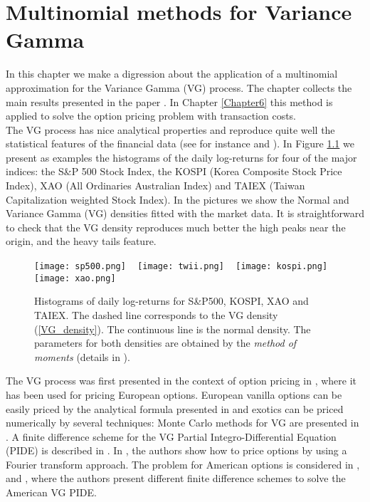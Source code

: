 

\chapter{Multinomial methods for Variance Gamma}\label{Chapter3}
\minitoc%

\vspace{5em}


 
In this chapter we make a digression about the application of a multinomial approximation for the Variance Gamma (VG) process.
The chapter collects the main results presented in the paper \cite{Canta2}. In Chapter \ref{Chapter6} this method is applied to solve the option pricing problem with 
transaction costs.\\
 
The VG process has nice analytical properties and 
reproduce quite well the statistical features of the financial data (see for instance \cite{Ait12} and \cite{Cont}).
In Figure \ref{FigPDF} we present as examples the histograms of the
daily log-returns for four of the major indices:  
the S\&P 500 Stock Index, 
the KOSPI (Korea Composite Stock Price Index), 
XAO (All Ordinaries Australian Index)  
and TAIEX (Taiwan Capitalization weighted Stock Index).
In the pictures we show the Normal and Variance Gamma (VG) densities fitted with the market data. 
It is straightforward to check that the 
VG density reproduces much better the high peaks near the origin, and the heavy tails feature.

\begin{figure}[t!]
 \centering
 \texttt{[image: sp500.png]}
 ~
 \texttt{[image: twii.png]}
 ~
 \texttt{[image: kospi.png]}
 ~
 \texttt{[image: xao.png]}
 \caption{Histograms of daily log-returns for S\&P500, KOSPI, XAO and TAIEX. The dashed line corresponds to the VG density (\ref{VG_density}). 
 The continuous line is the normal density. The parameters for both densities are obtained by the \emph{method of moments} (details in \cite{Se04}).}
 \label{FigPDF}
\end{figure} 

The VG process was first presented in the context of option pricing 
in \cite{MaMi91}, where it has been used for pricing European options.
European vanilla options can be easily priced by the analytical formula presented in \cite{MCC98} and exotics
can be priced numerically by several techniques:
Monte Carlo methods for VG are presented in \cite{Fu00}. 
A finite difference scheme for the VG Partial Integro-Differential Equation (PIDE) 
is described in \cite{CoVo05b}. In \cite{CaMa98}, the authors show how to price options by using a Fourier transform approach.
The problem for American options is considered in \cite{Al05}, \cite{Oo05} and \cite{HiMa01}, where the authors present different finite difference 
schemes to solve the American VG PIDE.

